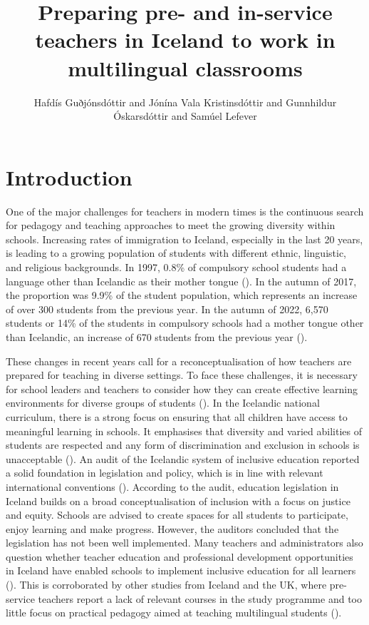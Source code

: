 \documentclass[output=paper]{langscibook}
\author{Hafdís Guðjónsdóttir\orcid{}\affiliation{University of Iceland} and Jónína Vala Kristinsdóttir\orcid{}\affiliation{University of Iceland} and Gunnhildur Óskarsdóttir\orcid{}\affiliation{University of Iceland} and Samúel Lefever\orcid{}\affiliation{University of Iceland}}
\title[Preparing teachers in Iceland to work in multilingual classrooms]{Preparing pre- and in-service teachers in Iceland to work in multilingual classrooms}
\begin{document}
\maketitle 
\label{chap:4}


\section{Introduction}

One of the major challenges for teachers in modern times is the continuous search for pedagogy and teaching approaches to meet the growing diversity within schools. Increasing rates of immigration to Iceland, especially in the last 20 years, is leading to a growing population of students with different ethnic, linguistic, and religious {backgrounds}{.} In 1997, 0.8\% of compulsory school students had a language other than Icelandic as their mother tongue (\citealt{Statistics_iceland2018}). In the autumn of 2017, the proportion was 9.9\% of the student population, which represents an increase of over 300 students from the previous year. In the autumn of 2022, 6,570 students or 14\% of the students in compulsory schools had a mother tongue other than Icelandic, an increase of 670 students from the previous year (\citealt{Statistics_iceland2023}).

These changes in recent years call for a reconceptualisation of how teachers are prepared for teaching in diverse settings.{ To face these challenges, it is necessary for school leaders and teachers to consider how they can create effective learning environments for diverse groups of students} (\citealt{Ainscow2008, Day2010-1, Florian2017-1}). In the Icelandic national curriculum, there is a strong focus on ensuring that all children have access to meaningful learning in schools. It emphasises that diversity and varied abilities of students are respected and any form of discrimination and exclusion in schools is unacceptable (\citealt{Ministry_of_education_science_and_culture2011}). An audit of the Icelandic system of inclusive education reported a solid foundation in legislation and policy, which is in line with relevant international conventions (\citealt{European_agency_for_special_needs_and_inclusive_education2017}). According to the audit, education legislation in Iceland builds on a broad conceptualisation of inclusion with a focus on justice and equity. Schools are advised to create spaces for all students to participate, enjoy learning and make progress. However, the auditors concluded that the legislation has not been well implemented. Many teachers and administrators also question whether teacher education and professional development opportunities in Iceland have enabled schools to implement inclusive education for all learners (\citealt{European_agency_for_special_needs_and_inclusive_education2017}).
This is corroborated by other studies from Iceland and the UK, where pre-service teachers report a lack of relevant courses in the study programme and too little focus on practical pedagogy aimed at teaching multilingual students (\citealt{FlocktonCunningham2021, chapters/2_Gunnthorsdottira}).
\end{document}
